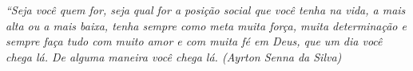 \begin{epigrafe}
    \vspace*{\fill}
	\begin{flushright}
		\textit{``Seja você quem for, seja qual for a posição social que você tenha na vida, a mais alta ou a mais baixa, tenha sempre como meta muita força, muita determinação e sempre faça tudo com muito amor e com muita fé em Deus, que um dia você chega lá. De alguma maneira você chega lá.
		(Ayrton Senna da Silva)}
	\end{flushright}
\end{epigrafe}

